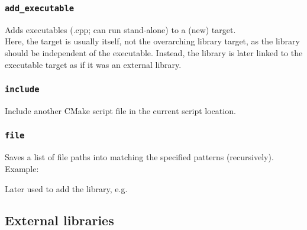 \subsubsection{\texttt{add\_executable}}
\begin{center}  \end{center}
Adds executables (.cpp; can run stand-alone) to a (new) target. \\

Here, the target is usually itself, not the overarching library target, as the library should be independent of the executable. Instead, the library is later linked to the executable target as if it was an external library. \\

\subsubsection{\texttt{include}}
\begin{center}  \end{center}
Include another CMake script file in the current script location.

\subsubsection{\texttt{file}}
\begin{center}  \end{center}
Saves a list of file paths into  matching the specified patterns (recursively). Example: \\

Later used to add the library, e.g. \\


\newpage
\subsection{External libraries}


